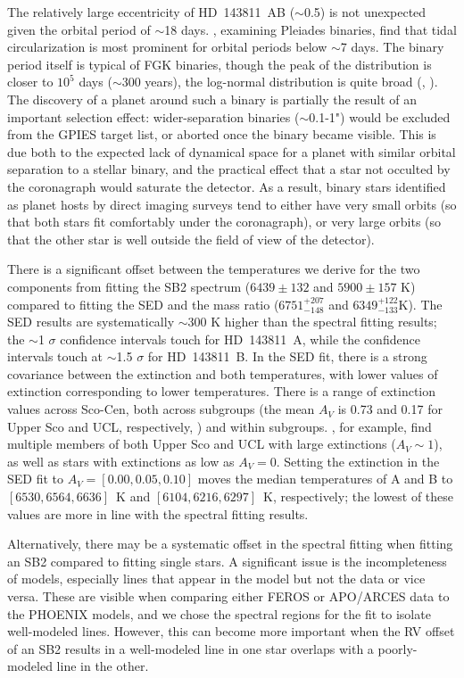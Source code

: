 \documentclass[]{aastex701} %
\begin{document}
The relatively large eccentricity of HD~143811~AB ($\sim$0.5) is not unexpected given the orbital period of $\sim$18 days. \citet{torres:2021}, examining Pleiades binaries, find that tidal circularization is most prominent for orbital periods below $\sim$7 days. The binary period itself is typical of FGK binaries, though the peak of the distribution is closer to $10^5$ days ($\sim$300 years), the log-normal distribution is quite broad (\citealt{Duquennoy:1991}, \citealt{Raghavan:2010}). The discovery of a planet around such a binary is partially the result of an important selection effect: wider-separation binaries ($\sim$0.1-1") would be excluded from the GPIES target list, or aborted once the binary became visible. This is due both to the expected lack of dynamical space for a planet with similar orbital separation to a stellar binary, and the practical effect that a star not occulted by the coronagraph would saturate the detector. As a result, binary stars identified as planet hosts by direct imaging surveys tend to either have very small orbits (so that both stars fit comfortably under the coronagraph), or very large orbits (so that the other star is well outside the field of view of the detector).

There is a significant offset between the temperatures we derive for the two components from fitting the SB2 spectrum ($6439 \pm 132$ and $5900 \pm 157$ K) compared to fitting the SED and the mass ratio ($6751^{+207}_{-148}$ and $6349^{+122}_{-133}$K). The SED results are systematically $\sim$300 K higher than the spectral fitting results; the $\sim$1 $\sigma$ confidence intervals touch for HD~143811~A, while the confidence intervals touch at $\sim$1.5 $\sigma$ for HD~143811~B. In the SED fit, there is a strong covariance between the extinction and both temperatures, with lower values of extinction corresponding to lower temperatures. There is a range of extinction values across Sco-Cen, both across subgroups (the mean $A_V$ is 0.73 and 0.17 for Upper Sco and UCL, respectively, \citealt{degeus:1989,wright:2018}) and within subgroups. \citet{pecaut:2016}, for example, find multiple members of both Upper Sco and UCL with large extinctions ($A_V \sim 1$), as well as stars with extinctions as low as $A_V = 0$. Setting the extinction in the SED fit to $A_V = [0.00, 0.05, 0.10]$ moves the median temperatures of A and B to $[6530,6564,6636]$~K and $[6104,6216,6297]$~K, respectively; the lowest of these values are more in line with the spectral fitting results.

Alternatively, there may be a systematic offset in the spectral fitting when fitting an SB2 compared to fitting single stars. A significant issue is the incompleteness of models, especially lines that appear in the model but not the data or vice versa. These are visible when comparing either FEROS or APO/ARCES data to the PHOENIX models, and we chose the spectral regions for the fit to isolate well-modeled lines. However, this can become more important when the RV offset of an SB2 results in a well-modeled line in one star overlaps with a poorly-modeled line in the other.
\end{document}

